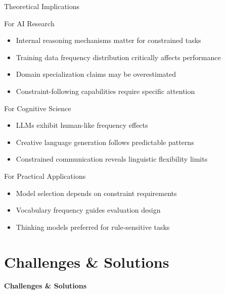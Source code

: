 \documentclass[aspectratio=169]{beamer}
\begin{document}
\begin{frame}{Theoretical Implications}
\begin{block}{For AI Research}
\begin{itemize}
    \item Internal reasoning mechanisms matter for constrained tasks
    \item Training data frequency distribution critically affects performance
    \item Domain specialization claims may be overestimated
    \item Constraint-following capabilities require specific attention
\end{itemize}
\end{block}

\begin{block}{For Cognitive Science}
\begin{itemize}
    \item LLMs exhibit human-like frequency effects
    \item Creative language generation follows predictable patterns
    \item Constrained communication reveals linguistic flexibility limits
\end{itemize}
\end{block}

\begin{block}{For Practical Applications}
\small
\begin{itemize}
    \item Model selection depends on constraint requirements
    \item Vocabulary frequency guides evaluation design
    \item Thinking models preferred for rule-sensitive tasks
\end{itemize}
\end{block}
\end{frame}

\section{Challenges \& Solutions}

\begin{frame}
\begin{center}
\Huge \textbf{Challenges \& Solutions}
\end{center}
\end{frame}
\end{document}
